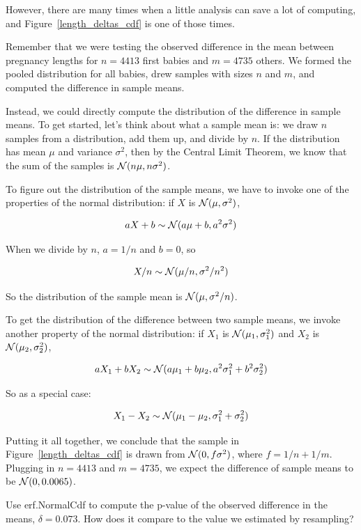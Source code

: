 \documentclass[12pt]{book}
\begin{document}
However, there are many times when a little analysis can save a lot of
computing, and Figure~\ref{length_deltas_cdf} is one of those times.

Remember that we were testing the observed difference in the mean between
pregnancy lengths for $n=4413$ first babies and $m=4735$ others.  We formed
the pooled distribution for all babies, drew samples with sizes $n$ and
$m$, and computed the difference in sample means.

Instead, we could directly compute the distribution of the difference
in sample means.  To get started, let's think about what a sample mean
is: we draw $n$ samples from a distribution, add them up, and
divide by $n$.  If the distribution has mean $\mu$ and variance
$\sigma^2$, then by the Central Limit Theorem, we know that the sum of
the samples is $\mathcal{N} (n \mu, n \sigma^2)$.

To figure out the distribution of the sample means, we have to invoke
one of the properties of the normal distribution: if $X$ is
$\mathcal{N} (\mu, \sigma^2)$,

\[ aX + b \sim \mathcal{N} (a \mu + b, a^2 \sigma^2) \]

When we divide by $n$, $a=1/n$ and $b=0$, so

\[ X/n \sim \mathcal{N} (\mu / n, \sigma^2/ n^2) \]

So the distribution of the sample mean is $\mathcal{N} (\mu, \sigma^2/n)$.

To get the distribution of the difference between two sample means,
we invoke another property of the normal distribution: if $X_1$ is
$\mathcal{N} (\mu_1, \sigma_1^2)$ and $X_2$ is
$\mathcal{N} (\mu_2, \sigma_2^2)$,

\[ aX_1 + bX_2 \sim \mathcal{N} (a\mu_1 + b\mu_2, 
                                 a^2\sigma_1^2 + b^2\sigma_2^2) \]

So as a special case:

\[ X_1 - X_2 \sim \mathcal{N} (\mu_1 - \mu_2, 
                               \sigma_1^2 + \sigma_2^2) \]

Putting it all together, we conclude that the sample in
Figure~\ref{length_deltas_cdf} is drawn from 
$\mathcal{N} (0, f \sigma^2)$, where $f = 1/n + 1/m$.  Plugging in
$n=4413$ and $m=4735$, we expect the difference of sample means to be
$\mathcal{N} (0, 0.0065)$.

\begin{ex}

Use erf.NormalCdf to compute the p-value of the observed difference
in the means, $\delta=0.073$.  How does it compare to the value
we estimated by resampling?

\end{ex}
\end{document}

